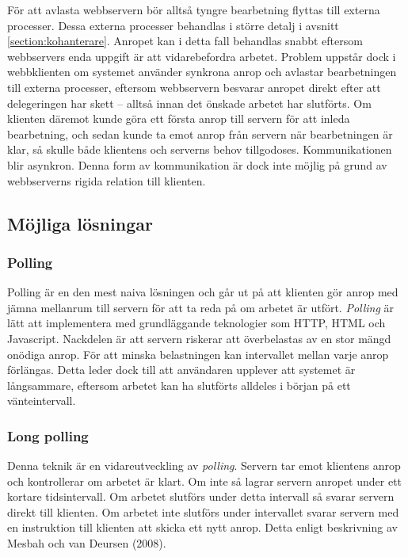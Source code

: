 För att avlasta webbservern bör alltså tyngre bearbetning flyttas till externa processer. Dessa externa processer behandlas i större detalj i avsnitt \ref{section:kohanterare}.
Anropet kan i detta fall behandlas snabbt eftersom webbservers enda uppgift är att vidarebefordra arbetet. Problem uppstår dock i webbklienten om systemet använder synkrona anrop och avlastar bearbetningen till externa processer, eftersom webbservern besvarar anropet direkt efter att delegeringen har skett – alltså innan det önskade arbetet har slutförts.
Om klienten däremot kunde göra ett första anrop till servern för att inleda bearbetning, och sedan kunde ta emot anrop från servern när bearbetningen är klar, så skulle både klientens och serverns behov tillgodoses. Kommunikationen blir asynkron. Denna form av kommunikation är dock inte möjlig på grund av webbserverns rigida relation till klienten.


\subsection{Möjliga lösningar}

\subsubsection{Polling} 
Polling är en den mest naiva lösningen och går ut på att klienten gör anrop med jämna mellanrum till servern för att ta reda på om arbetet är utfört. \emph{Polling} är lätt att implementera med grundläggande teknologier som HTTP, HTML och Javascript. Nackdelen är att servern riskerar att överbelastas av en stor mängd onödiga anrop. För att minska belastningen kan intervallet mellan varje anrop förlängas. Detta leder dock till att användaren upplever att systemet är långsammare, eftersom arbetet kan ha slutförts alldeles i början på ett vänteintervall.

\subsubsection{Long polling} 
Denna teknik är en vidareutveckling av \emph{polling}. Servern tar emot klientens anrop och kontrollerar om arbetet är klart. Om inte så lagrar servern anropet under ett kortare tidsintervall. Om arbetet slutförs under detta intervall så svarar servern direkt till klienten. Om arbetet inte slutförs under intervallet svarar servern med en instruktion till klienten att skicka ett nytt anrop. Detta enligt beskrivning av Mesbah och van Deursen (2008). 

